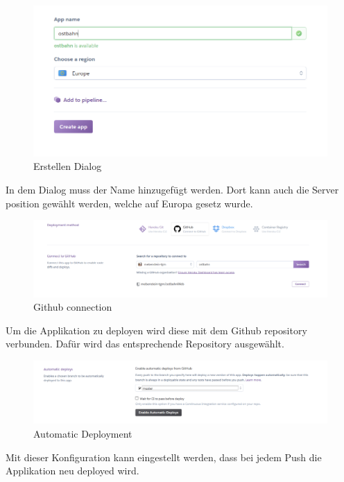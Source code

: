 \begin{figure}
	\centering
	\includegraphics[width=0.7\linewidth]{images/screenshot002}
	\caption{Erstellen Dialog}
	\label{fig:screenshot002}
\end{figure}

In dem Dialog muss der Name hinzugefügt werden. Dort kann auch die Server position gewählt werden, welche auf Europa gesetz wurde.

\begin{figure}
	\centering
	\includegraphics[width=0.7\linewidth]{images/screenshot004}
	\caption{Github connection}
	\label{fig:screenshot004}
\end{figure}

Um die Applikation zu deployen wird diese mit dem Github repository verbunden. Dafür wird das entsprechende Repository ausgewählt.\\

\begin{figure}
	\centering
	\includegraphics[width=0.7\linewidth]{images/screenshot005}
	\caption{Automatic Deployment}
	\label{fig:screenshot005}
\end{figure}

Mit dieser Konfiguration kann eingestellt werden, dass bei jedem Push die Applikation neu deployed wird.

